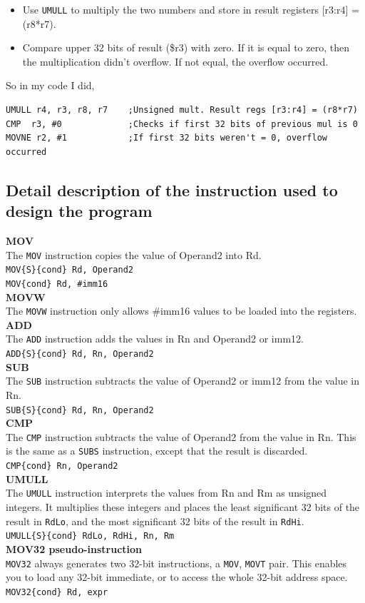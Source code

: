 \documentclass[footheight=20pt, footsepline, headheight=20pt, headsepline]{scrartcl}
\begin{document}
\begin{itemize}
    \item Use \verb|UMULL| to multiply the two numbers and store in result registers [r3:r4] = (r8*r7).
    \item Compare upper 32 bits of result (\$r3) with zero. If it is equal to zero, then the multiplication didn't overflow. If not equal, the overflow occurred.
\end{itemize}
So in my code I did,
\begin{verbatim}
UMULL r4, r3, r8, r7	;Unsigned mult. Result regs [r3:r4] = (r8*r7)
CMP  r3, #0				;Checks if first 32 bits of previous mul is 0
MOVNE r2, #1			;If first 32 bits weren't = 0, overflow occurred
\end{verbatim}


\subsection*{Detail description of the instruction used to design the program}
\textbf{MOV}\\
The \verb|MOV| instruction copies the value of Operand2 into Rd.\\
\verb|MOV{S}{cond} Rd, Operand2|\\
\verb|MOV{cond} Rd, #imm16|\\
\textbf{MOVW}\\The \verb|MOVW| instruction only allows \#imm16 values to be loaded into the registers.\\
\textbf{ADD}\\
The \verb|ADD| instruction adds the values in Rn and Operand2 or imm12.\\
\verb|ADD{S}{cond} Rd, Rn, Operand2|\\
\textbf{SUB}\\
The \verb|SUB| instruction subtracts the value of Operand2 or imm12 from the value in Rn.\\
\verb|SUB{S}{cond} Rd, Rn, Operand2|\\
\textbf{CMP}\\
The \verb|CMP| instruction subtracts the value of Operand2 from the value in Rn. This is the same as a \verb|SUBS| instruction, except that the result is discarded.\\
\verb|CMP{cond} Rn, Operand2|\\
\textbf{UMULL}\\
The \verb|UMULL| instruction interprets the values from Rn and Rm as unsigned integers. It multiplies these integers and places the least significant 32 bits of the result in \verb|RdLo|, and the most significant 32 bits of the result in \verb|RdHi|.\\
\verb|UMULL{S}{cond} RdLo, RdHi, Rn, Rm|\\
\textbf{MOV32 pseudo-instruction}\\
\verb|MOV32| always generates two 32-bit instructions, a \verb|MOV|, \verb|MOVT| pair. This enables you to load any 32-bit immediate, or to access the whole 32-bit address space.\\
\verb|MOV32{cond} Rd, expr|
\end{document}
